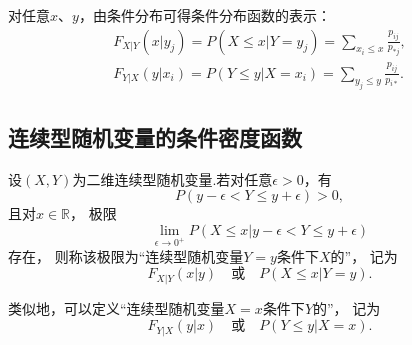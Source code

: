 \begin{theorem}
对任意\(x\)、\(y\)，由条件分布可得条件分布函数的表示：
\begin{align*}
	F_{X \vert Y}(x \vert y_j)
	= P(X \leq x \vert Y=y_j)
	= \sum_{x_i \leq x}{\frac{p_{ij}}{p_{*j}}}, \\
	F_{Y \vert X}(y \vert x_i)
	= P(Y \leq y \vert X=x_i)
	= \sum_{y_j \leq y}{\frac{p_{ij}}{p_{i*}}}.
\end{align*}
\end{theorem}

\subsection{连续型随机变量的条件密度函数}
\begin{definition}
设\((X,Y)\)为二维连续型随机变量.若对任意\(\epsilon > 0\)，有\begin{equation*}
	P(y - \epsilon < Y \leq y + \epsilon) > 0,
\end{equation*}
且对\(x\in\mathbb{R}\)，
极限\begin{equation*}
	\lim_{\epsilon\to0^+} P(X \leq x \vert y - \epsilon < Y \leq y + \epsilon)
\end{equation*}存在，
则称该极限为“连续型随机变量\(Y=y\)条件下\(X\)的”，
记为\begin{equation*}
	F_{X \vert Y}(x \vert y)
	\quad\text{或}\quad
	P(X \leq x \vert Y = y).
\end{equation*}

类似地，可以定义“连续型随机变量\(X=x\)条件下\(Y\)的”，
记为\begin{equation*}
	F_{Y \vert X}(y \vert x)
	\quad\text{或}\quad
	P(Y \leq y \vert X = x).
\end{equation*}
\end{definition}

